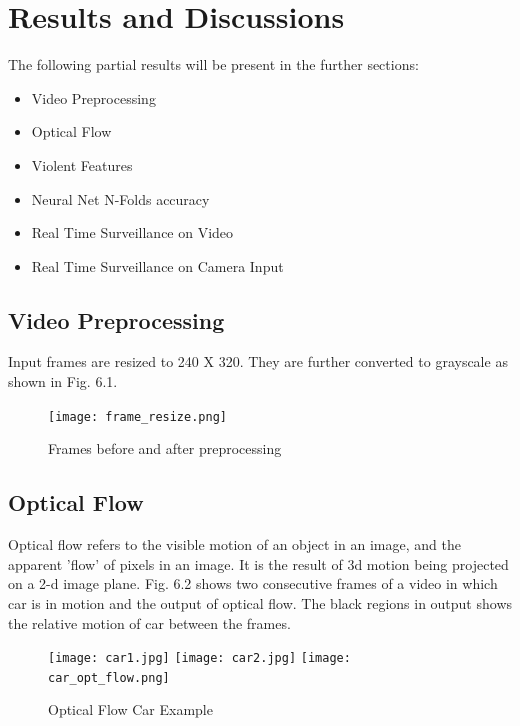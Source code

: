 \clearpage
\chapter{Results and Discussions}
The following partial results will be present in the further sections:
\begin{itemize}
	\item Video Preprocessing
	\item Optical Flow
	\item Violent Features
	\item Neural Net N-Folds accuracy
	\item Real Time Surveillance on Video
	\item Real Time Surveillance on Camera Input
\end{itemize}
\section{Video Preprocessing}
 Input frames are resized to 240 X 320. They are further converted to grayscale as shown in Fig. 6.1.
\begin{center}
\begin{figure}[H]
\centering
\texttt{[image: frame\_resize.png]}
\caption{Frames before and after preprocessing}
\end{figure}
\end{center}
\section{Optical Flow}
Optical flow refers to the visible motion of an object in an image, and the apparent 'flow' of pixels in an image. It is the result of 3d motion being projected on a 2-d image plane. Fig. 6.2 shows two consecutive frames of a video in which car is in motion and the output of optical flow. The black regions in output shows the relative motion of car between the frames.
\begin{figure}[htp]
\centering
\texttt{[image: car1.jpg]}\hfill
\texttt{[image: car2.jpg]}\hfill
\texttt{[image: car\_opt\_flow.png]}
\caption{Optical Flow Car Example}
\end{figure}

